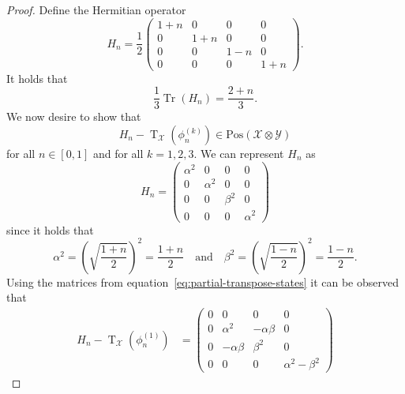 \documentclass[11pt]{article}
\theoremstyle{definition}
\newcommand{\tr}{\operatorname{Tr}}
\newcommand{\pt}{\operatorname{T}}
\newcommand{\setft}[1]{\mathrm{#1}}
\newcommand{\Pos}{\setft{Pos}}
\newcommand{\X}{\mathcal{X}}
\newcommand{\Y}{\mathcal{Y}}
\begin{document}
\begin{proof}
    Define the Hermitian operator
    \begin{equation}
        H_n = \frac{1}{2}
        \begin{pmatrix}
            1+n & 0 & 0 & 0 \\
            0 & 1+n & 0 & 0 \\
            0 & 0 & 1-n & 0 \\
            0 & 0 & 0 & 1+n
        \end{pmatrix}.
    \end{equation}
    It holds that
    \begin{equation}
        \frac{1}{3} \tr(H_n) = \frac{2 + n}{3}.
    \end{equation}
    We now desire to show that
    \begin{equation}
        H_n - \pt_{\X}\left(\phi_n^{(k)}\right) \in \Pos(\X \otimes \Y)
    \end{equation}
    for all $n \in [0, 1]$ and for all $k = 1, 2, 3$. We can represent $H_n$ as
    \begin{equation}
        H_n = 
        \begin{pmatrix}
            \alpha^2 & 0 & 0 & 0 \\
            0 & \alpha^2 & 0 & 0 \\
            0 & 0 & \beta^2 & 0 \\
            0 & 0 & 0 & \alpha^2
        \end{pmatrix}
    \end{equation}
    since it holds that
    \begin{equation}
        \alpha^2 = \left(\sqrt{\frac{1+n}{2}}\right)^2 = \frac{1+n}{2} 
        \quad \text{and} \quad 
        \beta^2 = \left(\sqrt{\frac{1-n}{2}}\right)^2 = \frac{1-n}{2}.
    \end{equation}
    Using the matrices from equation~\eqref{eq:partial-transpose-states} it can
    be observed that
    \begin{equation}\label{eq:three-state-constraint}
        \begin{aligned}
            H_n - \pt_{\X}\left(\phi_n^{(1)}\right) &=
            \begin{pmatrix}
                0 & 0 & 0 & 0 \\
                0 & \alpha^2 & -\alpha\beta & 0 \\
                0 & -\alpha\beta & \beta^2 & 0 \\
                0 & 0 & 0 & \alpha^2 - \beta^2

\end{pmatrix}
\end{aligned}
\end{equation}
\end{proof}
\end{document}
